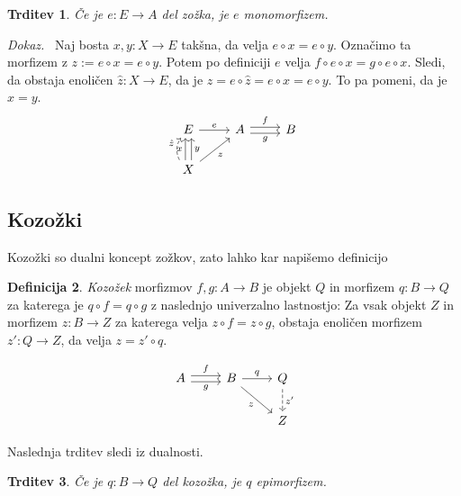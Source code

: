 \documentclass[12pt,a4paper]{book}
\theoremstyle{definition}
\newtheorem{definicija}{Definicija}[chapter]
\theoremstyle{plain}
\newtheorem{trditev}[definicija]{Trditev}
\newenvironment{dokaz}{\emph{Dokaz.}\ }{\hspace{\fill}{$\Box$}}
\theoremstyle{definition}
\theoremstyle{remark}
\begin{document}
\begin{trditev}
Če je $e : E \to A$ del zožka, je $e$ monomorfizem.
\end{trditev}
\begin{dokaz}
Naj bosta $x,y : X \to E$ takšna, da velja $e \circ x = e \circ y$. Označimo ta morfizem z $z := e \circ x = e \circ y$. Potem po definiciji $e$ velja $f \circ e \circ x = g \circ e \circ x$. Sledi, da obstaja enoličen $\hat{z} : X \to E$, da je $z = e \circ \hat{z} = e \circ x = e \circ y$. To pa pomeni, da je $x = y$.
%
$$\begin{tikzcd}
E \ar[r, "e"] & A \ar[r, shift left, "f"] \ar[r, shift right, "g"'] & B \\
X \ar[u, bend left, shift left, dashed, "\hat{z}"] \ar[u, shift left, "x"] \ar[u, shift right, "y"'] \ar[ur, "z"']
\end{tikzcd}$$
%
\end{dokaz}


\subsection{Kozožki}

Kozožki so dualni koncept zožkov, zato lahko kar napišemo definicijo

\begin{definicija}
\emph{Kozožek} morfizmov $f,g:A \to B$ je objekt $Q$ in morfizem $q: B \to Q$ za katerega je $q \circ f = q \circ g$ z naslednjo univerzalno lastnostjo: Za vsak objekt $Z$ in morfizem $z : B \to Z$ za katerega velja $z \circ f = z \circ g$, obstaja enoličen morfizem $z' : Q \to Z$, da velja $z = z' \circ q$.

$$\begin{tikzcd}
A \ar[r, shift left, "f"] \ar[r, shift right, "g"'] & B \ar[r, "q"] \ar[dr, "z"'] & Q \ar[d, dashed, "z'"] \\
& & Z
\end{tikzcd}$$

\end{definicija}

Naslednja trditev sledi iz dualnosti.

\begin{trditev}
Če je $q : B \to Q$ del kozožka, je $q$ epimorfizem.
\end{trditev}
\end{document}
